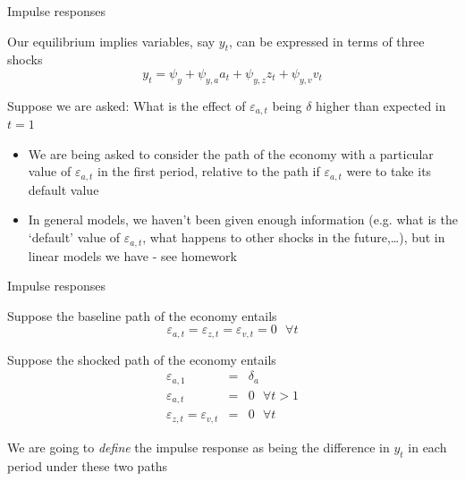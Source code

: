 \documentclass{beamer}
\begin{document}
	
\begin{frame}{Impulse responses}

Our equilibrium implies variables, say $y_{t}$, can be expressed in terms of three shocks
\[
y_{t} = \psi_{y} + \psi_{y,a} a_{t} + \psi_{y,z} z_{t} + \psi_{y,v} v_{t}
\]

\vspace{2mm}
Suppose we are asked: What is the effect of $\varepsilon_{a,t}$ being $\delta$ higher than expected in $t=1$
\begin{itemize}
\item	We are being asked to consider the path of the economy with a particular value of $\varepsilon_{a,t}$ in the first period, relative to the path if $\varepsilon_{a,t}$ were to take its default value
\item	In general models, we haven't been given enough information (e.g. what is the `default' value of $\varepsilon_{a,t}$, what happens to other shocks in the future,\ldots), but in linear models we have - see homework
\end{itemize}

\end{frame}


	
\begin{frame}{Impulse responses}

Suppose the baseline path of the economy entails
\[
\varepsilon_{a,t}=\varepsilon_{z,t}=\varepsilon_{v,t}=0 \text{  }\forall t
\]

\vspace{2mm}
Suppose the shocked path of the economy entails
\begin{eqnarray*}
\varepsilon_{a,1} &=& \delta_{a} \\
\varepsilon_{a,t} &=& 0 \text{  }\forall t>1 \\
\varepsilon_{z,t}=\varepsilon_{v,t}&=&0 \text{  }\forall t
\end{eqnarray*}

\vspace{2mm}
We are going to \emph{define} the impulse response as being the difference in $y_{t}$ in each period under these two paths


\end{frame}
\end{document}
